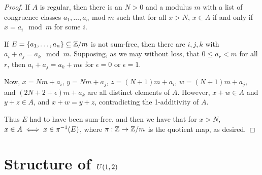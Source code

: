 \documentclass{article}
\theoremstyle{definition}
\theoremstyle{remark}
\numberwithin{equation}{section}
\begin{document}
\begin{proof}
  If $A$ is regular, then there is an $N > 0$ and a modulus $m$ with a
  list of congruence classes $a_1, \ldots, a_n$ mod $m$ such that for
  all $x > N$, $x \in A$ if and only if $x = a_i \mod{m}$ for some
  $i$.  

  If $E = \{a_1, \ldots, a_n\} \subseteq \mathbb{Z}/m$ is not sum-free, then there
  are $i, j, k$ with $a_i + a_j = a_k \mod{m}$.  Supposing, as we may
  without loss, that $0 \leq a_r < m$ for all $r$, then
  $a_i + a_j = a_k + m\epsilon$ for $\epsilon = 0$ or $\epsilon = 1$.

  Now, $x = Nm + a_i$, $y = Nm + a_j$, $z = (N+1)m + a_i$,
  $w = (N+1)m+a_j$, and $(2N+2+\epsilon)m + a_k$ are all distinct
  elements of $A$.  However, $x+w \in A$ and $y+z \in A$, and
  $x + w = y + z$, contradicting the 1-additivity of $A$.

  Thus $E$ had to have been sum-free, and then we have that for
  $x > N$, $x \in A \iff x \in \pi^{-1}(E)$, where $\pi : \mathbb{Z} \to \mathbb{Z}/m$
  is the quotient map, as desired.
\end{proof}

\section{Structure of $U(1,2)$}
\end{document}
